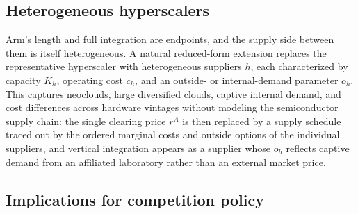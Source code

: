 \documentclass[11pt]{article}
\begin{document}
\subsection{Heterogeneous hyperscalers}
\label{sec:integration-hetero}

Arm's length and full integration are endpoints, and the supply side between them is itself heterogeneous. A natural reduced-form extension replaces the representative hyperscaler with heterogeneous suppliers $h$, each characterized by capacity $K_h$, operating cost $c_h$, and an outside- or internal-demand parameter $o_h$. This captures neoclouds, large diversified clouds, captive internal demand, and cost differences across hardware vintages without modeling the semiconductor supply chain: the single clearing price $r^A$ is then replaced by a supply schedule traced out by the ordered marginal costs and outside options of the individual suppliers, and vertical integration appears as a supplier whose $o_h$ reflects captive demand from an affiliated laboratory rather than an external market price.

\subsection{Implications for competition policy}
\label{sec:integration-policy}
\end{document}
